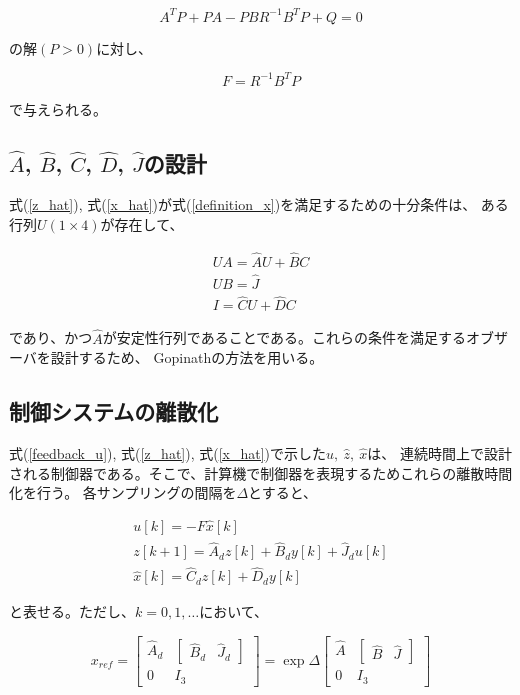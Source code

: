 $$
    A^{T}P + PA - PBR^{-1}B^{T}P + Q = 0
$$

の解$(P > 0)$に対し、

$$
    F = R^{-1}B^{T}P
$$

で与えられる。

\subsection{$\hat{A}$, $\hat{B}$, $\hat{C}$, $\hat{D}$, $\hat{J}$の設計}
式(\ref{z_hat}), 式(\ref{x_hat})が式(\ref{definition_x})を満足するための十分条件は、
ある行列$U(1 \times 4)$が存在して、

$$
    \begin{array}{c}
        UA = \hat{A}U + \hat{B}C \\
        UB = \hat{J} \\
        I = \hat{C}U + \hat{D}C
    \end{array}
$$

であり、かつ$\hat{A}$が安定性行列であることである。これらの条件を満足するオブザーバを設計するため、
Gopinathの方法を用いる。

\subsection{制御システムの離散化}
式(\ref{feedback_u}), 式(\ref{z_hat}), 式(\ref{x_hat})で示した$u,\ \hat{z},\ \hat{x}$は、
連続時間上で設計される制御器である。そこで、計算機で制御器を表現するためこれらの離散時間化を行う。
各サンプリングの間隔を$\Delta$とすると、

$$
    \begin{array}{c}
        u[k] = -F \hat{x}[k] \\
        z[k + 1] = \hat{A}_{d}z[k] + \hat{B}_{d}y[k] + \hat{J}_{d}u[k] \\
        \hat{x}[k] = \hat{C}_{d}z[k] + \hat{D}_{d}y[k]
    \end{array}
$$

と表せる。ただし、$k = 0, 1, \dots$において、

$$
    x_{ref} = 
    \left[
        \begin{array}{cc}
            \hat{A}_{d}  &  \left[
                                \begin{array}{cc}
                                    \hat{B}_{d}  &  \hat{J}_{d}
                                \end{array}
                            \right] \\
            0            &  I_{3}
        \end{array}
    \right]
    =
    \exp \Delta
    \left[
        \begin{array}{cc}
            \hat{A}  &  \left[
                            \begin{array}{cc}
                                \hat{B}  &  \hat{J}
                            \end{array}
                        \right] \\
            0        &  I_{3}
        \end{array}
    \right]
$$

